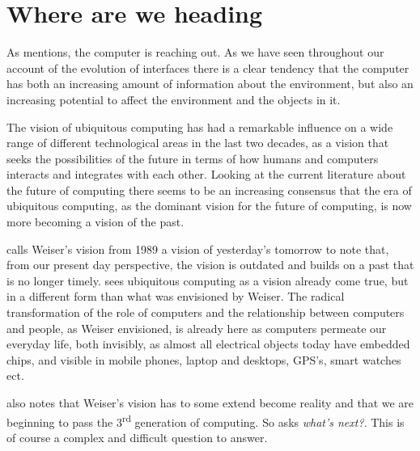 \section{Where are we heading}
As \citet{grudin1990computer} mentions, the computer is reaching out.
As we have seen throughout our account of the evolution of interfaces there is a clear tendency that the computer has both an increasing amount of information about the environment, but also an increasing potential to affect the environment and the objects in it.  

The vision of ubiquitous computing has had a remarkable influence on a wide range of different technological areas in the last two decades, as a vision that seeks the possibilities of the future in terms of how humans and computers interacts and integrates with each other.
Looking at the current literature about the future of computing there seems to be an increasing consensus that the era of ubiquitous computing, as the dominant vision for the future of computing, is now more becoming a vision of the past.

\citet{bell2007yesterday} calls Weiser's vision from 1989 a vision of yesterday's tomorrow to note that, from our present day perspective, the vision is outdated and builds on a past that is no longer timely.
\citeauthor{bell2007yesterday} sees ubiquitous computing as a vision already come true, but in a different form than what was envisioned by Weiser.
The radical transformation of the role of computers and the relationship between computers and people, as Weiser envisioned, is already here as computers permeate our everyday life, both invisibly, as almost all electrical objects today have embedded chips, and visible in mobile phones, laptop and desktops, GPS's, smart watches ect.

\citet{abowd2012next} also notes that Weiser's vision has to some extend become reality and that we are beginning to pass the 3\textsuperscript{rd} generation of computing.
So \citeauthor{abowd2012next} asks \textit{what's next?}.
This is of course a complex and difficult question to answer.

